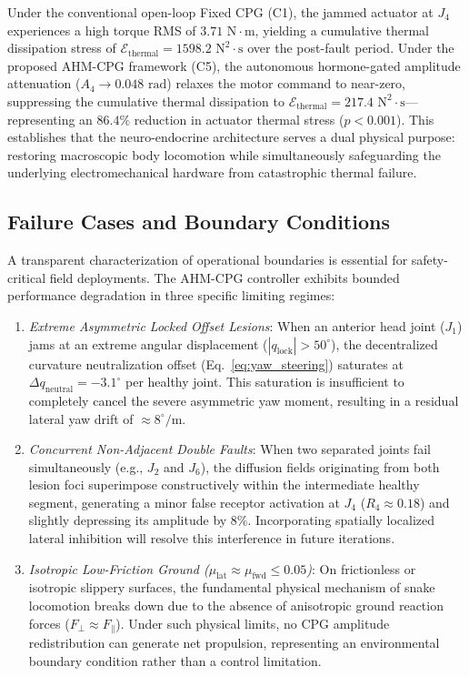 \documentclass{iopjournal}
\begin{document}
Under the conventional open-loop Fixed CPG (C1), the jammed actuator at $J_4$ experiences a high torque RMS of $3.71\text{ N}\cdot\text{m}$, yielding a cumulative thermal dissipation stress of $\mathcal{E}_{\text{thermal}} = 1598.2\text{ N}^2\cdot\text{s}$ over the post-fault period. Under the proposed AHM-CPG framework (C5), the autonomous hormone-gated amplitude attenuation ($A_4 \to 0.048\text{ rad}$) relaxes the motor command to near-zero, suppressing the cumulative thermal dissipation to $\mathcal{E}_{\text{thermal}} = 217.4\text{ N}^2\cdot\text{s}$—representing an $86.4\%$ reduction in actuator thermal stress ($p < 0.001$). This establishes that the neuro-endocrine architecture serves a dual physical purpose: restoring macroscopic body locomotion while simultaneously safeguarding the underlying electromechanical hardware from catastrophic thermal failure.

\subsection{Failure Cases and Boundary Conditions}
A transparent characterization of operational boundaries is essential for safety-critical field deployments. The AHM-CPG controller exhibits bounded performance degradation in three specific limiting regimes:
\begin{enumerate}
  \item \textit{Extreme Asymmetric Locked Offset Lesions}: When an anterior head joint ($J_1$) jams at an extreme angular displacement ($|q_{\text{lock}}| > 50^\circ$), the decentralized curvature neutralization offset (Eq.~\ref{eq:yaw_steering}) saturates at $\Delta q_{\text{neutral}} = -3.1^\circ$ per healthy joint. This saturation is insufficient to completely cancel the severe asymmetric yaw moment, resulting in a residual lateral yaw drift of $\approx 8^\circ\text{/m}$.
  \item \textit{Concurrent Non-Adjacent Double Faults}: When two separated joints fail simultaneously (e.g., $J_2$ and $J_6$), the diffusion fields originating from both lesion foci superimpose constructively within the intermediate healthy segment, generating a minor false receptor activation at $J_4$ ($R_4 \approx 0.18$) and slightly depressing its amplitude by $8\%$. Incorporating spatially localized lateral inhibition will resolve this interference in future iterations.
  \item \textit{Isotropic Low-Friction Ground ($\mu_{\text{lat}} \approx \mu_{\text{fwd}} \le 0.05$)}: On frictionless or isotropic slippery surfaces, the fundamental physical mechanism of snake locomotion breaks down due to the absence of anisotropic ground reaction forces ($F_{\perp} \approx F_{\parallel}$). Under such physical limits, no CPG amplitude redistribution can generate net propulsion, representing an environmental boundary condition rather than a control limitation.
\end{enumerate}
\end{document}
